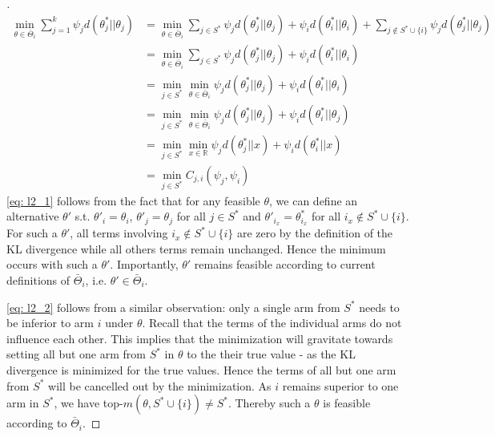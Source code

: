 \begin{proof}[]
  \begin{align}
    \min_{\theta \in \bar{\Theta}_i} \sum_{j=1}^k \psi_j d(\theta^*_j||\theta_j)
      &= \min_{\theta \in \bar{\Theta}_i} \sum_{j\in S^*}
          \psi_{j}d(\theta^*_{j} || \theta_{j}) + \psi_{i}d(\theta_{i}^* ||
          \theta_{i}) + \sum_{j \notin S^* \cup \{i\}} \psi_j
          d(\theta^*_j||\theta_j) \\
      &= \min_{\theta \in \bar{\Theta}_i} \sum_{j\in S^*}
          \psi_{j}d(\theta^*_{j} || \theta_{j}) + \psi_{i}d(\theta_{i}^* ||
          \theta_{i}) \label{eq: l2_1}\\
      &= \min_{j\in S^*} \min_{\theta \in \bar{\Theta}_i}
          \psi_{j}d(\theta^*_{j} || \theta_{j}) + \psi_{i}d(\theta_{i}^* ||
          \theta_{i}) \label{eq: l2_2}\\
      &= \min_{j\in S^*} \min_{\theta \in \bar{\Theta}_i}
          \psi_{j}d(\theta^*_{j} || \theta_{j}) + \psi_{i}d(\theta_{i}^* ||
          \theta_{j}) \label{eq: l2_3}\\
      &= \min_{j\in S^*} \min_{x \in \mathbb{R}} \psi_{j}d(\theta^*_{j} || x) +
          \psi_{i}d(\theta_{i}^* ||x) \label{eq: l2_4}\\
      &= \min_{j \in S^*} C_{j, i}(\psi_j, \psi_i)
  \end{align}
  \eqref{eq: l2_1} follows from the fact that for any feasible $\theta$, we can
  define an alternative $\theta'$ s.t. $\theta'_i = \theta_i$, $\theta'_j =
  \theta_j$ for all $j \in S^*$ and $\theta'_{i_x} = \theta^*_{i_x}$ for all
  $i_x \notin S^* \cup \{i\}$. For such a $\theta'$, all terms involving $i_x
  \notin S^* \cup \{i\}$ are zero by the definition of the KL divergence while
  all others terms remain unchanged. Hence the minimum occurs with such a
  $\theta'$. Importantly, $\theta'$ remains feasible according to current
  definitions of $\bar{\Theta}_i$, i.e. $\theta' \in \bar{\Theta}_i$.

  \eqref{eq: l2_2} follows from a similar observation: only a single arm from
  $S^*$ needs to be inferior to arm $i$ under $\theta$. Recall that the terms of
  the individual arms do not influence each other. This implies that the
  minimization will gravitate towards setting all but one arm from $S^*$ in
  $\theta$ to the their true value - as the KL divergence is minimized for the
  true values. Hence the terms of all but one arm from $S^*$ will be cancelled
  out by the minimization. As $i$ remains superior to one arm in $S^*$, we have
  top-$m(\theta, S^* \cup \{i\}) \neq S^*$. Thereby such a $\theta$ is feasible
  according to $\bar{\Theta}_i$.


\end{proof}
